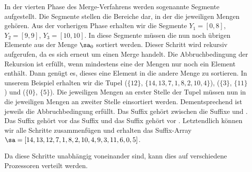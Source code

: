 In der vierten Phase des Merge-Verfahrens werden sogenannte Segmente aufgestellt. Die Segmente stellen die Bereiche dar, in der die jeweiligen Mengen gehören. Aus der vorherigen Phase erhalten wir die Segmente $Y_1 = [0, 8]$, $Y_2 = [9, 9]$, $Y_3 = [10, 10]$. In diese Segmente müssen die nun noch übrigen Elemente aus der Menge $\sa_0$ sortiert werden. Dieser Schritt wird rekursiv aufgerufen, da es sich erneut um einen Merge handelt. Die Abbruchbedingung der Rekursion ist erfüllt, wenn mindestens eine der Mengen nur noch ein Element enthält. Dann genügt es, dieses eine Element in die andere Menge zu sortieren. 
In unserem Beispiel erhalten wir die Tupel ($\{12\}$, $\{14, 13, 7, 1, 8, 2, 10, 4\}$), ($\{3\}$, $\{11\}$) und ($\{0\}$, $\{5\}$). Die jeweiligen Mengen an erster Stelle der Tupel müssen nun in die jeweiligen Mengen an zweiter Stelle einsortiert werden. Dementsprechend ist jeweils die Abbruchbedingung erfüllt. Das Suffix  gehört zwischen die Suffixe  und . Das Suffix  gehört vor das Suffix  und das Suffix  gehört vor .
Letztendlich können wir alle Schritte zusammenfügen und erhalten das Suffix-Array $\sa = [14, 13, 12, 7, 1, 8, 2, 10, 4, 9, 3, 11, 6, 0, 5]$.

Da diese Schritte unabhängig voneinander sind, kann dies auf verschiedene Prozessoren verteilt werden.